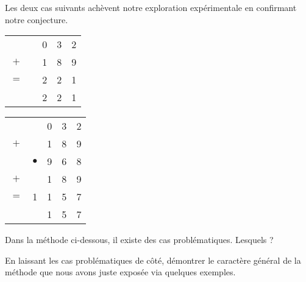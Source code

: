 Les deux cas suivants achèvent notre exploration expérimentale en confirmant notre conjecture.
\begin{multicols}{2}
\begin{center}
\begin{tabular}{ccccc}
	    &          & 0 & 3 & 2 \\
	$+$ &          & 1 & 8 & 9 \\
	\hline
	$=$ &          & 2 & 2 & 1 \\
	\hline
	\hline
        & \sign{+} & 2 & 2 & 1 \\
\end{tabular}
\end{center}

\null\vfill

\columnbreak

\begin{center}
\begin{tabular}{ccccc}
	    & \sign{-}  & 0 & 3 & 2 \\
	$+$ &           & 1 & 8 & 9 \\
	\hline
	\hline
	    & $\bullet$ & 9 & 6 & 8 \\
	$+$ &           & 1 & 8 & 9 \\
	\hline
	$=$ & 1         & 1 & 5 & 7 \\
	\hline
	\hline
        & \sign{+}  & 1 & 5 & 7 \\
\end{tabular}
\end{center}
\end{multicols}


\begin{exercise}
	Dans la méthode ci-dessous, il existe des cas problématiques. Lesquels ?
\end{exercise}


\begin{exercise}
	En laissant les cas problématiques de côté, démontrer le caractère général de la méthode que nous avons juste exposée via quelques exemples.
\end{exercise}

